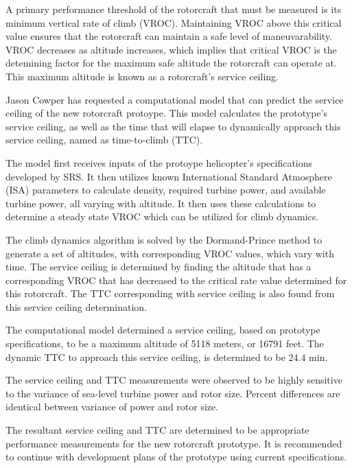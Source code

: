 \documentclass[12pt]{report}
\begin{document}
A primary performance threshold of the rotorcraft that must be measured is its minimum vertical rate of climb (VROC). Maintaining VROC above
this critical value ensures that the rotorcraft can maintain a safe level of maneuvarability. VROC decreases as altitude
increases, which implies that critical VROC is the detemining factor for the maximum safe altitude the rotorcraft can operate at. This
maximum altitude is known as a rotorcraft's service ceiling.

Jason Cowper has requested a computational model that can predict the service ceiling of the new rotorcraft protoype. This model 
calculates the prototype's service ceiling, as well as the time that will elapse to dynamically approach this service ceiling, named as 
time-to-climb (TTC).

The model first receives inputs of the protoype helicopter's specifications developed by SRS. It then utilizes known International
Standard Atmosphere (ISA) parameters to calculate density, required turbine power, and available turbine power, all varying with altitude.
It then uses these calculations to determine a steady state VROC which can be utilized for climb dynamics.

The climb dynamics algorithm is solved by the Dormand-Prince method to generate a set of altitudes, with corresponding
VROC values, which vary with time. The service ceiling is determined by finding the altitude that has a corresponding VROC that has
decreased to the critical rate value determined for this rotorcraft. The TTC corresponding with service ceiling is also found from this
service ceiling determination.

The computational model determined a service ceiling, based on prototype specifications, to be a maximum altitude of 5118 meters, or 16791 feet.
The dynamic TTC to approach this service ceiling, is determined to be 24.4 min.

The service ceiling and TTC measurements were observed to be highly sensitive to the variance of sea-level turbine power and rotor size.
Percent differences are identical between variance of power and rotor size.

The resultant service ceiling and TTC are determined to be appropriate performance measurements for the new rotorcraft prototype. It is
recommended to continue with development plans of the prototype using current specifications.


\newpage
\end{document}
